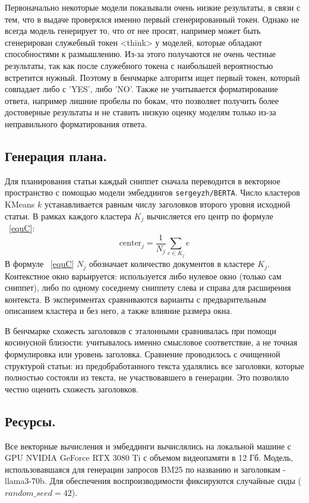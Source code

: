 \documentclass{article}
\theoremstyle{definition}
\theoremstyle{plain}
\begin{document}
Первоначально некоторые модели показывали очень низкие результаты, в связи с тем, что в выдаче проверялся именно первый сгенерированный токен. Однако не всегда модель генерирует то, что от нее просят, например может быть сгенерирован служебный
токен <think> у моделей, которые обладают способностями к размышлению. Из-за этого получаются не очень честные результаты, так как после служебного токена с наибольшей вероятностью встретится нужный. Поэтому в бенчмарке алгоритм ищет первый токен,
который совпадает либо с 'YES', либо 'NO'. Также не учитывается форматирование ответа, например лишние пробелы по бокам, что позволяет получить более достоверные результаты и не ставить низкую оценку моделям только из-за неправильного форматирования ответа.

\subsection*{Генерация плана.}
Для планирования статьи каждый сниппет сначала переводится в векторное пространство с помощью модели эмбеддингов \texttt{sergeyzh/BERTA}. 
Число кластеров KMeans \(k\) устанавливается равным числу заголовков второго уровня исходной статьи.  
В рамках каждого кластера $K_j$ вычисляется его центр по формуле ~\eqref{equC}:
\begin{equation}\label{equC}
\text{center}_j = \frac{1}{N_j} \sum_{e \in K_j} e
\end{equation}
В формуле ~\eqref{equC} $N_j$ обозначает количество документов в кластере $K_j$.
Контекстное окно варьируется: используется либо нулевое окно (только сам сниппет), либо по одному соседнему сниппету слева и справа для расширения контекста. 
В экспериментах сравниваются варианты с предварительным описанием кластера и без него, а также влияние размера окна. 

В бенчмарке схожесть заголовков с эталонными сравнивалась при помощи косинусной близости: учитывалось именно смысловое соответствие, а не точная формулировка или уровень заголовка. 
Сравнение проводилось с очищенной структурой статьи: из предобработанного текста удалялись все заголовки, которые полностью состояли из текста, не участвовавшего в генерации. 
Это позволяло честно оценить схожесть заголовков.

\subsection*{Ресурсы.}
Все векторные вычисления и эмбеддинги вычислялись на локальной машине с GPU NVIDIA GeForce RTX 3080 Ti с объемом видеопамяти в 12 Гб.
Модель, использовавшаяся для генерации запросов BM25 по названию и заголовкам - llama3-70b. 
Для обеспечения воспроизводимости фиксируются случайные сиды ($random\_seed = 42$).
\end{document}
